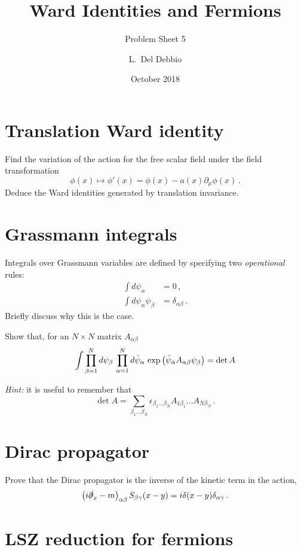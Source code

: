 \documentclass{tutorial}
\subtitle{Problem Sheet 5}
\title{Ward Identities and Fermions}
\author{L.~Del Debbio}
\date{October 2018}
\begin{document}
\maketitle

   \section{Translation Ward identity} 
    
    Find the variation of the action for the free scalar field under
    the field transformation
    \[
    \phi(x) \mapsto \phi'(x) = \phi(x) - a(x) \partial_\mu \phi(x)\, .
    \]
    Deduce the Ward identities generated by translation invariance. 

    
    
   \section{Grassmann integrals}

    Integrals over Grassmann variables are defined by specifying two
    \emph{operational} rules:
    \begin{align*}
      \int d\psi_\alpha &= 0\, ,\\
      \int d\psi_\alpha \psi_\beta &= \delta_{\alpha\beta}\, .
    \end{align*}
    Briefly discuss why this is the case.

    Show that, for an $N\times N$ matrix $A_{\alpha\beta}$ 
    \[
    \int \prod_{\beta=1}^N d\psi_\beta\,
    \prod_{\alpha=1}^N d\bar{\psi}_\alpha\,
    \exp\left(
      \bar{\psi}_\alpha A_{\alpha\beta} \psi_\beta
      \right) = \det A
    \]
    
    \emph{Hint:} it is useful to remember that 
    \[
    \det A = \sum_{\beta_1\ldots \beta_N} 
    \epsilon_{\beta_1\ldots\beta_N} 
    A_{1\beta_1} \ldots A_{N\beta_N}\, .
    \]

    

     \section{Dirac propagator} 
      
      Prove that the Dirac propagator is the inverse of the kinetic
      term in the action, \ie
      \[
      \left(i \slashed{\partial}_x -m \right)_{\alpha\beta}
      S_{\beta\gamma}(x-y) = i \delta(x-y) \delta_{\alpha\gamma}\, .
      \]

   \section{LSZ reduction for fermions}
    
\end{document}
